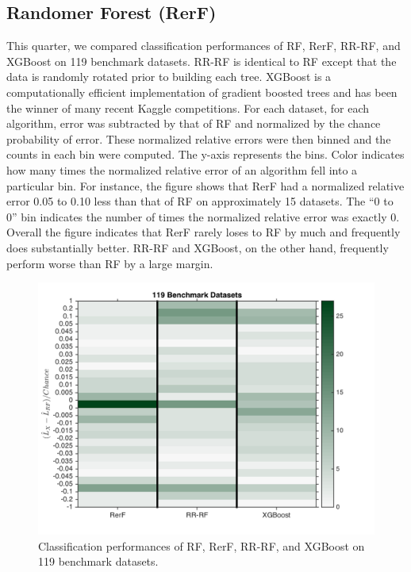 \documentclass[simplex.tex]{subfiles}
\begin{document}
\subsection[Randomer Forest]{Randomer Forest (RerF)}

This quarter, we compared classification performances of RF, RerF, RR-RF, and XGBoost on 119 benchmark datasets. RR-RF is identical to RF except that
the data is randomly rotated prior to building each tree. XGBoost is a
computationally efficient implementation of gradient boosted trees and
has been the winner of many recent Kaggle competitions. For each
dataset, for each algorithm, error was subtracted by that of RF and
normalized by the chance probability of error. These
normalized relative errors were then binned and the counts in each bin
were computed. The y-axis represents the bins. Color indicates how many
times the normalized relative error of an algorithm fell into a
particular bin. For instance, the figure shows that RerF had a
normalized relative error 0.05 to 0.10 less than that of RF on
approximately 15 datasets. The ``0 to 0'' bin indicates the number of
times the normalized relative error was exactly 0. Overall the figure
indicates that RerF rarely loses to RF by much and frequently does
substantially better. RR-RF and XGBoost, on the other hand, frequently
perform worse than RF by a large margin.

\begin{figure}[h!]
\begin{cframed}
\centering
\includegraphics[height=0.4\textheight]{../../figs/rerF_benchmark.png}
\caption{
Classification performances of RF, RerF, RR-RF, and XGBoost
on 119 benchmark datasets.
}
\label{fig:RefF3}
\end{cframed}
\end{figure}
\end{document}
